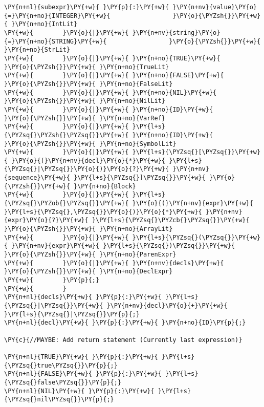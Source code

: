 \begin{Verbatim}[commandchars=\\\{\}]
\PY{n+nl}{subexpr}\PY{+w}{ }\PY{p}{:}\PY{+w}{ }\PY{n+nv}{value}\PY{o}{=}\PY{n+no}{INTEGER}\PY{+w}{                 }\PY{o}{\PYZsh{}}\PY{+w}{ }\PY{n+no}{IntLit}
\PY{+w}{        }\PY{o}{|}\PY{+w}{ }\PY{n+nv}{string}\PY{o}{=}\PY{n+no}{STRING}\PY{+w}{                 }\PY{o}{\PYZsh{}}\PY{+w}{ }\PY{n+no}{StrLit}
\PY{+w}{        }\PY{o}{|}\PY{+w}{ }\PY{n+no}{TRUE}\PY{+w}{                          }\PY{o}{\PYZsh{}}\PY{+w}{ }\PY{n+no}{TrueLit}
\PY{+w}{        }\PY{o}{|}\PY{+w}{ }\PY{n+no}{FALSE}\PY{+w}{                         }\PY{o}{\PYZsh{}}\PY{+w}{ }\PY{n+no}{FalseLit}
\PY{+w}{        }\PY{o}{|}\PY{+w}{ }\PY{n+no}{NIL}\PY{+w}{                           }\PY{o}{\PYZsh{}}\PY{+w}{ }\PY{n+no}{NilLit}
\PY{+w}{        }\PY{o}{|}\PY{+w}{ }\PY{n+no}{ID}\PY{+w}{                            }\PY{o}{\PYZsh{}}\PY{+w}{ }\PY{n+no}{VarRef}
\PY{+w}{        }\PY{o}{|}\PY{+w}{ }\PY{l+s}{\PYZsq{}\PYZsh{}\PYZsq{}}\PY{+w}{ }\PY{n+no}{ID}\PY{+w}{                        }\PY{o}{\PYZsh{}}\PY{+w}{ }\PY{n+no}{SymbolLit}
\PY{+w}{        }\PY{o}{|}\PY{+w}{ }\PY{l+s}{\PYZsq{}[\PYZsq{}}\PY{+w}{ }\PY{o}{(}\PY{n+nv}{decl}\PY{o}{*}\PY{+w}{ }\PY{l+s}{\PYZsq{}|\PYZsq{}}\PY{o}{)}\PY{o}{?}\PY{+w}{ }\PY{n+nv}{sequence}\PY{+w}{ }\PY{l+s}{\PYZsq{}]\PYZsq{}}\PY{+w}{ }\PY{o}{\PYZsh{}}\PY{+w}{ }\PY{n+no}{Block}
\PY{+w}{        }\PY{o}{|}\PY{+w}{ }\PY{l+s}{\PYZsq{}\PYZob{}\PYZsq{}}\PY{+w}{ }\PY{o}{(}\PY{n+nv}{expr}\PY{+w}{ }\PY{l+s}{\PYZsq{},\PYZsq{}}\PY{o}{)}\PY{o}{*}\PY{+w}{ }\PY{n+nv}{expr}\PY{o}{?}\PY{+w}{ }\PY{l+s}{\PYZsq{}\PYZcb{}\PYZsq{}}\PY{+w}{     }\PY{o}{\PYZsh{}}\PY{+w}{ }\PY{n+no}{ArrayLit}
\PY{+w}{        }\PY{o}{|}\PY{+w}{ }\PY{l+s}{\PYZsq{}(\PYZsq{}}\PY{+w}{ }\PY{n+nv}{expr}\PY{+w}{ }\PY{l+s}{\PYZsq{})\PYZsq{}}\PY{+w}{                  }\PY{o}{\PYZsh{}}\PY{+w}{ }\PY{n+no}{ParenExpr}
\PY{+w}{        }\PY{o}{|}\PY{+w}{ }\PY{n+nv}{decls}\PY{+w}{                         }\PY{o}{\PYZsh{}}\PY{+w}{ }\PY{n+no}{DeclExpr}
\PY{+w}{        }\PY{p}{;}
\PY{+w}{        }
\PY{n+nl}{decls}\PY{+w}{ }\PY{p}{:}\PY{+w}{ }\PY{l+s}{\PYZsq{}|\PYZsq{}}\PY{+w}{ }\PY{n+nv}{decl}\PY{o}{+}\PY{+w}{ }\PY{l+s}{\PYZsq{}|\PYZsq{}}\PY{p}{;}
\PY{n+nl}{decl}\PY{+w}{ }\PY{p}{:}\PY{+w}{ }\PY{n+no}{ID}\PY{p}{;}

\PY{c}{//MAYBE: Add return statement (Currently last expression)}

\PY{n+nl}{TRUE}\PY{+w}{ }\PY{p}{:}\PY{+w}{ }\PY{l+s}{\PYZsq{}true\PYZsq{}}\PY{p}{;}
\PY{n+nl}{FALSE}\PY{+w}{ }\PY{p}{:}\PY{+w}{ }\PY{l+s}{\PYZsq{}false\PYZsq{}}\PY{p}{;}
\PY{n+nl}{NIL}\PY{+w}{ }\PY{p}{:}\PY{+w}{ }\PY{l+s}{\PYZsq{}nil\PYZsq{}}\PY{p}{;}


\end{Verbatim}
